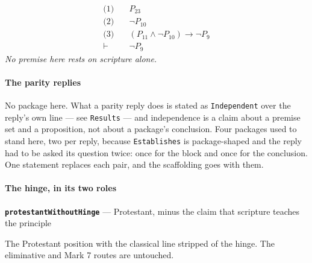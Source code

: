 \documentclass[11pt]{article}
\begin{document}
\begin{align*}
  \text{(1)} \quad & P_{23} \\
  \text{(2)} \quad & \lnot P_{10} \\
  \text{(3)} \quad & (P_{11} \land \lnot P_{10}) \rightarrow \lnot P_{9} \\
  \vdash \quad & \lnot P_{9}
\end{align*}
\emph{No premise here rests on scripture alone.}
\paragraph*{The parity replies}
\leavevmode\par
No package here. What a parity reply does is stated as \texttt{Independent} over the reply's own line — see \texttt{Results} — and independence is a claim about a premise set and a proposition, not about a package's conclusion. Four packages used to stand here, two per reply, because \texttt{Establishes} is package-shaped and the reply had to be asked its question twice: once for the block and once for the conclusion. One statement replaces each pair, and the scaffolding goes with them.

\paragraph*{The hinge, in its two roles}
\leavevmode\par
\par\medskip\noindent\textbf{\texttt{protestant\allowbreak{}Without\allowbreak{}Hinge}} --- Protestant, minus the claim that scripture teaches the principle\par\nobreak\noindent
The Protestant position with the classical line stripped of the hinge. The eliminative and Mark 7 routes are untouched.
\end{document}
